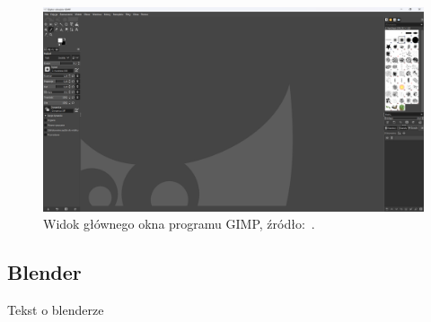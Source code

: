 \begin{figure}[h]
    \centering
    \includegraphics[width=.9\textwidth]{chapters/chapter2/img/gimp}
    \caption[Widok głównego okna programu GIMP.]{Widok głównego okna programu GIMP, źródło:~\cite{gimp_site}.}
    \label{fig:gimp_okno}
\end{figure}

\subsection{Blender}
\label{subsec:blender}

Tekst o blenderze \todo
